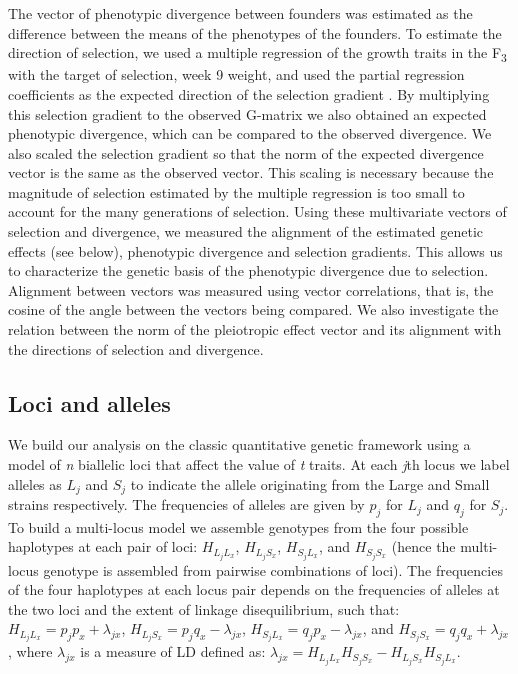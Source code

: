 \begin{refsection}
The vector of phenotypic divergence between founders was estimated as
the difference between the means of the phenotypes of the founders. To
estimate the direction of selection, we used a multiple regression of
the growth traits in the F\textsubscript{3} with the target of
selection, week 9 weight, and used the partial regression coefficients
as the expected direction of the selection gradient \parencite{Lande1983-ez}. By multiplying this
selection gradient to the observed G-matrix we also obtained an expected
phenotypic divergence, which can be compared to the observed divergence.
We also scaled the selection gradient so that the norm of the expected
divergence vector is the same as the observed vector. This scaling is
necessary because the magnitude of selection estimated by the multiple
regression is too small to account for the many generations of
selection. Using these multivariate vectors of selection and divergence,
we measured the alignment of the estimated genetic effects (see below), phenotypic
divergence and selection gradients. This allows us to characterize the
genetic basis of the phenotypic divergence due to selection. Alignment between vectors was measured
using vector correlations, that is, the cosine of the angle between the
vectors being compared. We also investigate the relation between the
norm of the pleiotropic effect vector and its alignment with the
directions of selection and divergence.

\subsection{Loci and alleles}

We build our analysis on the classic quantitative genetic framework
using a model of \emph{n} biallelic loci that affect the value of
\emph{t} traits. At each \emph{j}th locus we label alleles
as \(L_{j}\) and \(S_{j}\) to indicate the allele originating from the Large
and Small strains respectively. The frequencies of alleles are given
by \(p_{j}\) for \(L_{j}\) and \(q_{j}\) for \(S_{j}\). To build a multi-locus
model we assemble genotypes from the four possible haplotypes at each
pair of loci: \(H_{L_{j}L_{x}}\), \(H_{L_{j}S_{x}}\), \(H_{S_{j}L_{x}}\), and \(H_{S_{j}S_{x}}\) (hence
the multi-locus genotype is assembled from pairwise combinations of
loci). The frequencies of the four haplotypes at each locus pair depends
on the frequencies of alleles at the two loci and the extent of linkage
disequilibrium, such
that: \(H_{L_{j}L_{x}} = p_{j}p_{x} + \lambda_{jx}\), \(H_{L_{j}S_{x}} = p_{j}q_{x} - \lambda_{jx}\), \(H_{S_{j}L_{x}} = q_{j}p_{x} - \lambda_{jx}\), and \(H_{S_{j}S_{x}} = q_{j}q_{x} + \lambda_{jx}\), where \(\lambda_{jx}\) is a measure of LD defined as: \(\lambda_{jx} = H_{L_{j}L_{x}}H_{S_{j}S_{x}} - H_{L_{j}S_{x}}H_{S_{j}L_{x}}\).


\end{refsection}
